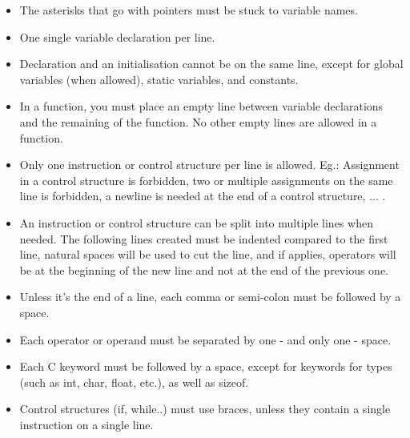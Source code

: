\documentclass{42-en}
\begin{document}
\begin{itemize}
            \item The asterisks that go with pointers must be stuck to
              variable names.

            \item One single variable declaration per line.

            \item Declaration and an initialisation cannot be
              on the same line, except for global variables (when allowed),
              static variables, and constants.

            \item In a function, you must place an empty line between
              variable declarations and the remaining of the function.
              No other empty lines are allowed in a function.

            \item Only one instruction or control structure per line is allowed. Eg.: Assignment in
              a control structure is forbidden, two or multiple assignments on the same line is forbidden,
              a newline is needed at the end of a control structure, ... .

            \item An instruction or control structure can be split into multiple lines when needed.
              The following lines created must be indented compared to the first line,
              natural spaces will be used to cut the line, and if applies, operators will be
              at the beginning of the new line and not at the end of the previous one.

            \item Unless it's the end of a line, each comma or semi-colon
              must be followed by a space.

            \item Each operator or operand must be separated by one
              - and only one - space.

            \item Each C keyword must be followed by a space, except for
              keywords for types (such as int, char, float, etc.),
              as well as sizeof.

            \item Control structures (if, while..) must use braces, unless they contain a single
              instruction on a single line.

            \end{itemize}
\end{document}

